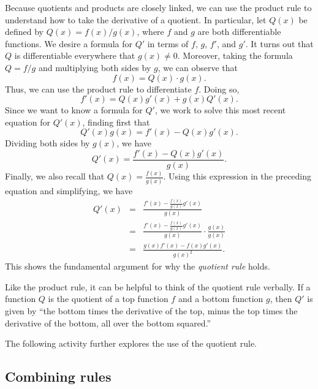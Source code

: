 Because quotients and products are closely linked, we can use the product rule to understand how to take the derivative of a quotient.  In particular, let $Q(x)$ be defined by $Q(x) = f(x)/g(x)$, where $f$ and $g$ are both differentiable functions.  We desire a formula for $Q'$ in terms of $f$, $g$, $f'$, and $g'$.  It turns out that $Q$ is differentiable everywhere that $g(x) \ne 0$.  Moreover, taking the formula $Q = f/g$ and multiplying both sides by $g$, we can observe that 
\[ f(x) = Q(x) \cdot g(x). \]
Thus, we can use the product rule to differentiate $f$.  Doing so,
\[ f'(x) = Q(x) g'(x) + g(x) Q'(x).\]
Since we want to know a formula for $Q'$, we work to solve this most recent equation for $Q'(x)$, finding first that
\[ Q'(x) g(x) = f'(x) - Q(x) g'(x).\]
Dividing both sides by $g(x)$, we have
\[ Q'(x) = \frac{f'(x) - Q(x) g'(x)}{g(x)}.\]
Finally, we also recall that $Q(x) = \frac{f(x)}{g(x)}.$  Using this expression in the preceding equation and simplifying, we have
\begin{eqnarray*}
Q'(x) & = & \frac{f'(x) - \frac{f(x)}{g(x)} g'(x)}{g(x)} \\
	& = & \frac{f'(x) - \frac{f(x)}{g(x)} g'(x)}{g(x)} \cdot \frac{g(x)}{g(x)} \\
	& = & \frac{g(x) f'(x) -  f(x) g'(x)}{g(x)^2}. 
\end{eqnarray*}
This shows the fundamental argument for why the \emph{quotient rule} holds.


Like the product rule, it can be helpful to think of the quotient rule verbally.  If a function $Q$ is the quotient of a top function $f$ and a bottom function $g$, then $Q'$ is given by ``the bottom times the derivative of the top, minus the top times the derivative of the bottom, all over the bottom squared.''  


The following activity further explores the use of the quotient rule.


\subsection*{Combining rules}


